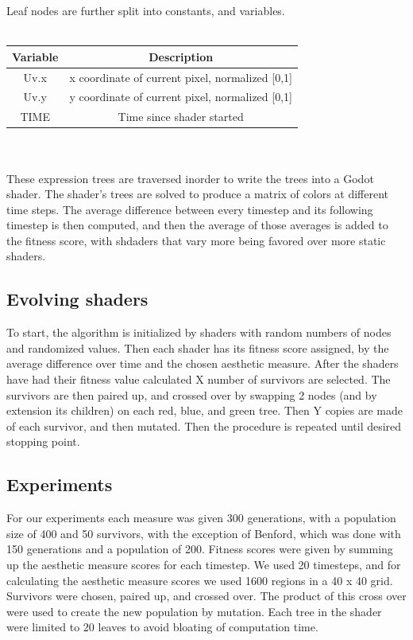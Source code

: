 \documentclass{acmart}
\begin{document}
Leaf nodes are further split into constants, and variables. 
\\\\
\begin{tabular}{|c|c|}
    \hline
    Variable & Description \\ 
    \hline
    Uv.x & x coordinate of current pixel, normalized [0,1]\\
    \hline
    Uv.y & y coordinate of current pixel, normalized [0,1]\\
    \hline
    TIME & Time since shader started\\
    \hline
\end{tabular}\\\\
These expression trees are traversed inorder to write the trees into a Godot shader. The shader's trees are solved to produce a matrix of colors at different time steps. The average difference between every timestep and its following timestep is then computed,
and then the average of those averages is added to the fitness score, with shdaders that vary more being favored over more static shaders.
\subsection*{Evolving shaders}
To start, the algorithm is initialized by shaders with random numbers of nodes and randomized values. Then each shader has its fitness score assigned, by the average difference over time and the chosen aesthetic measure. 
After the shaders have had their fitness value calculated X number of survivors are selected. The survivors are then paired up, and crossed over by swapping 2 nodes (and by extension its children) on each red, blue, and green
tree. Then Y copies are made of each survivor, and then mutated. Then the procedure is repeated until desired stopping point.
\subsection*{Experiments}
For our experiments each measure was given 300 generations, with a population size of 400 and 50 survivors, with the exception of Benford, which was done with 150 generations and a population of 200. Fitness scores were given by summing up the aesthetic measure scores for each timestep.
We used 20 timesteps, and for calculating the aesthetic measure scores we used 1600 regions in a 40 x 40 grid. Survivors were chosen, paired up, and crossed over. The product of this 
cross over were used to create the new population by mutation. Each tree in the shader were limited to 20 leaves to avoid bloating of computation time.
\end{document}
